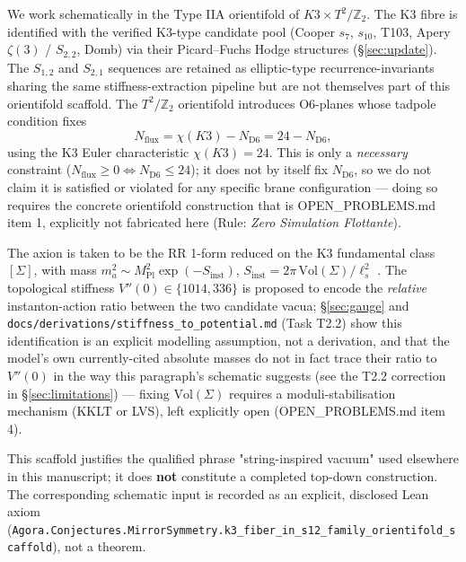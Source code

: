 \documentclass[11pt,a4paper]{article}
\begin{document}
We work schematically in the Type IIA orientifold of $K3\times T^2/\mathbb{Z}_2$. The K3 fibre is identified with the verified K3-type candidate pool (Cooper $s_7$, $s_{10}$, T103, Apery $\zeta(3)$ / $S_{2,2}$, Domb) via their Picard--Fuchs Hodge structures (\S\ref{sec:update}). The $S_{1,2}$ and $S_{2,1}$ sequences are retained as elliptic-type recurrence-invariants sharing the same stiffness-extraction pipeline but are not themselves part of this orientifold scaffold. The $T^2/\mathbb{Z}_2$ orientifold introduces O6-planes whose tadpole condition fixes
\begin{equation}
N_\mathrm{flux} = \chi(K3) - N_\mathrm{D6} = 24 - N_\mathrm{D6},
\end{equation}
using the K3 Euler characteristic $\chi(K3)=24$. This is only a \emph{necessary} constraint ($N_\mathrm{flux}\ge0 \Leftrightarrow N_\mathrm{D6}\le24$); it does not by itself fix $N_\mathrm{D6}$, so we do not claim it is satisfied or violated for any specific brane configuration — doing so requires the concrete orientifold construction that is OPEN\_PROBLEMS.md item 1, explicitly not fabricated here (Rule: \emph{Zero Simulation Flottante}).

The axion is taken to be the RR 1-form reduced on the K3 fundamental class $[\Sigma]$, with mass $m_a^2\sim M_\mathrm{Pl}^2\exp(-S_\mathrm{inst})$, $S_\mathrm{inst}=2\pi\,\mathrm{Vol}(\Sigma)/\ell_s^2$ \cite{svrcek2006axions}. The topological stiffness $V''(0)\in\{1014,336\}$ is proposed to encode the \emph{relative} instanton-action ratio between the two candidate vacua; \S\ref{sec:gauge} and \texttt{docs/derivations/stiffness\_to\_potential.md} (Task T2.2) show this identification is an explicit modelling assumption, not a derivation, and that the model's own currently-cited absolute masses do not in fact trace their ratio to $V''(0)$ in the way this paragraph's schematic suggests (see the T2.2 correction in \S\ref{sec:limitations}) — fixing $\mathrm{Vol}(\Sigma)$ requires a moduli-stabilisation mechanism (KKLT or LVS), left explicitly open (OPEN\_PROBLEMS.md item 4).

This scaffold justifies the qualified phrase "string-inspired vacuum" used elsewhere in this manuscript; it does \textbf{not} constitute a completed top-down construction. The corresponding schematic input is recorded as an explicit, disclosed Lean axiom (\texttt{Agora.Conjectures.MirrorSymmetry.k3\_fiber\_in\_s12\_family\_orientifold\_scaffold}), not a theorem.
\end{document}
